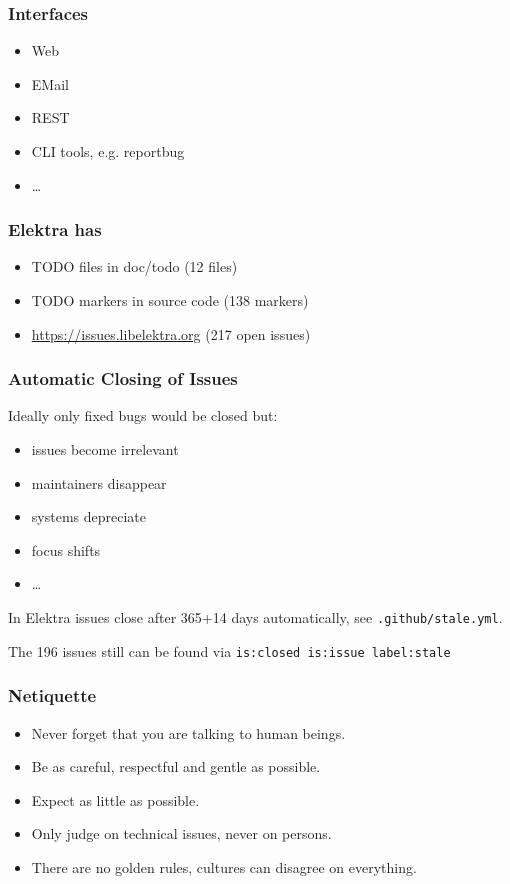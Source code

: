 \begin{frame}
	\frametitle{Interfaces}

	\begin{itemize}
		\item Web
		\item EMail
		\item REST
		\item CLI tools, e.g. reportbug
		\item \dots
	\end{itemize}
\end{frame}

\begin{frame}
	\frametitle{Elektra has}
	\begin{itemize}
		\item TODO files in doc/todo (12 files)
		\item TODO markers in source code (138 markers)
		\item \url{https://issues.libelektra.org} (217 open issues)
	\end{itemize}
\end{frame}

\begin{frame}[fragile]
	\frametitle{Automatic Closing of Issues}

	Ideally only fixed bugs would be closed but:
	\begin{itemize}
		\item issues become irrelevant
		\item maintainers disappear
		\item systems depreciate
		\item focus shifts
		\item \dots
	\end{itemize}
	\vspace{1cm}

	In Elektra issues close after 365+14 days automatically, see
	\verb+.github/stale.yml+.

	\vspace{1cm}
	The 196 issues still can be found via \verb+is:closed is:issue label:stale+
\end{frame}

\begin{frame}
	\frametitle{Netiquette}

	\begin{itemize}
		\item Never forget that you are talking to human beings.
		\item Be as careful, respectful and gentle as possible.
		\item Expect as little as possible.
		\item Only judge on technical issues, never on persons.
		\item There are no golden rules, cultures can disagree on everything.
	\end{itemize}
\end{frame}

